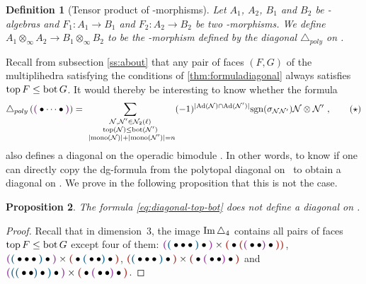 \documentclass[twoside, 12pt]{amsart}
\newtheorem{definition}{Definition}[section]
\newtheorem{proposition}[definition]{Proposition}
\theoremstyle{remark}
\begin{document}

\begin{definition}[Tensor product of \Ainf -morphisms]
Let $A_1$, $A_2$, $B_1$ and $B_2$ be \Ainf -algebras and $F_1 : A_1 \rightarrow B_1$ and $F_2 : A_2 \rightarrow B_2$ be two \Ainf -morphisms. We define $A_1 \otimes_\infty A_2 \rightarrow B_1 \otimes_\infty B_2$ to be the \Ainf -morphism defined by the diagonal $\triangle_{poly}$ on \Minf .
\end{definition}

Recall from subsection \ref{ss:about} that any pair of faces $(F,G)$ of the multiplihedra satisfying the conditions of \cref{thm:formuladiagonal} always satisfies $\operatorname{top} F \leq \operatorname{bot} G$. It would thereby be interesting to know whether the formula
\begin{align*}
\triangle_{poly} \left( \purple{\bullet \cdots \bullet} \right) = 
\sum_{\substack{
  \mathcal{N},\mathcal{N}' \in \mathcal{N}_2(\gra) \\ 
  \tp(\mathcal{N}) \leq \bm(\mathcal{N'}) \\
  \ |\mono(\mathcal{N})|+|\mono(\mathcal{N}')|=n
}}
(-1)^{|\mathrm{Ad}(\mathcal{N})\cap \mathrm{Ad}(\mathcal{N}')|}\mathrm{sgn}(\sigma_{\mathcal{N}\mathcal{N}'})\mathcal{N} \otimes \mathcal{N}' \ , \tag{$\star$}
\label{eq:diagonal-top-bot}
\end{align*}  
also defines a diagonal on the operadic bimodule \Minf . In other words, to know if one can directly copy the dg-formula from the polytopal diagonal on \Ainf\ to obtain a diagonal on \Minf . We prove in the following proposition that this is not the case. 

\begin{proposition}
The formula \ref{eq:diagonal-top-bot} does not define a diagonal on \Minf .
\end{proposition}

\begin{proof}
Recall that in dimension~$3$, the image $\operatorname{Im} \triangle_4$ contains all pairs of faces $\operatorname{top} F\leq \operatorname{bot} G$ except four of them: $\purple{\blue{\bullet \bullet \bullet} \bullet} \times \red{\bullet \red{\purple{\bullet \bullet} \bullet}}$, $\purple{\blue{\bullet \bullet \bullet}\bullet} \times \red{\bullet \blue{\bullet \bullet}\bullet}$, $\red{\blue{\bullet \bullet \bullet}\bullet} \times \red{\bullet \purple{\bullet \bullet}\bullet}$ and $\purple{\blue{\blue{\bullet \bullet}\bullet}\bullet} \times \red{\bullet \purple{\bullet \bullet}\bullet}$.
\end{proof}
\end{document}
